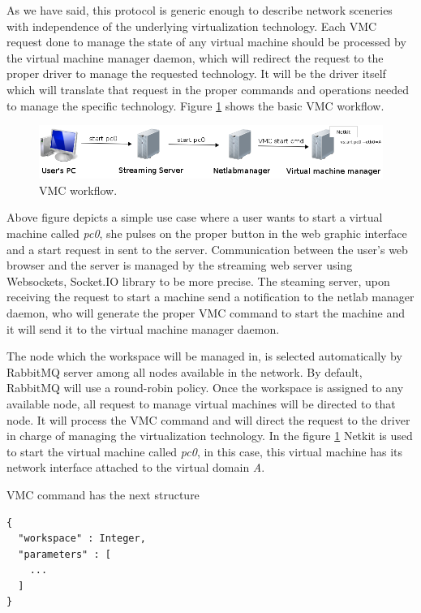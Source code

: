 \documentclass{article}
\begin{document}
As we have said, this protocol is generic enough to describe network sceneries with independence of the underlying virtualization technology. Each VMC request done to manage the state of any virtual machine should be processed by the virtual machine manager daemon, which will redirect the request to the proper driver to manage the requested technology. It will be the driver itself which will translate that request in the proper commands and operations needed to manage the specific technology. Figure \ref{img:vmc_workflow} shows the basic VMC workflow.

\begin{figure}[h!]
  \centering
    \includegraphics[scale=0.5]{./img/vmc_schema.png}
  \caption{VMC workflow.}
  \label{img:vmc_workflow}
\end{figure}

Above figure depicts a simple use case where a user wants to start a virtual machine called \textit{pc0}, she pulses on the proper button in the web graphic interface and a start request in sent to the server. Communication between the user's web browser and the server is managed by the streaming web server using Websockets, Socket.IO library to be more precise. The steaming server, upon receiving the request to start a machine send a notification to the netlab manager daemon, who will generate the proper VMC command to start the machine and it will send it to the virtual machine manager daemon.

The node which the workspace will be managed in, is selected automatically by RabbitMQ server among all nodes available in the network. By default, RabbitMQ will use a round-robin policy. Once the workspace is assigned to any available node, all request to manage virtual machines will be directed to that node. It will process the VMC command and will direct the request to the driver in charge of managing the virtualization technology. In the figure \ref{img:vmc_workflow} Netkit is used to start the virtual machine called \textit{pc0}, in this case, this virtual machine has its network interface attached to the virtual domain \textit{A}.

VMC command has the next structure

\begin{verbatim}
{
  "workspace" : Integer,
  "parameters" : [
    ...
  ]
}
\end{verbatim}
\end{document}
